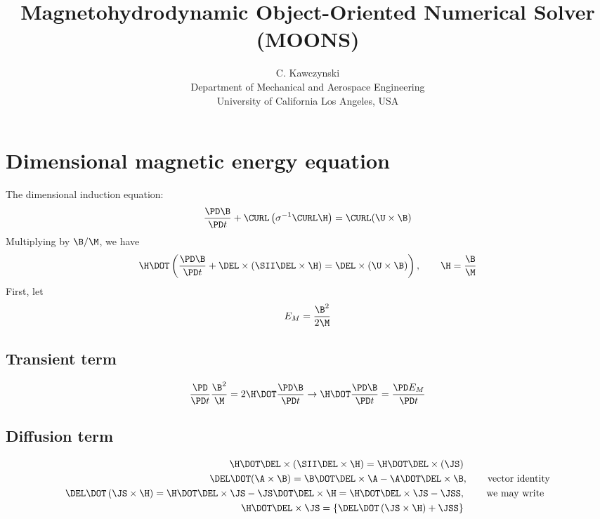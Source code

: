 \documentclass[11pt]{article}
\begin{document}
\doublespacing
\title{Magnetohydrodynamic Object-Oriented Numerical Solver (MOONS)}
\author{C. Kawczynski \\
Department of Mechanical and Aerospace Engineering \\
University of California Los Angeles, USA\\
}
\maketitle

\section{Dimensional magnetic energy equation}
The dimensional induction equation:
\begin{equation}
	\frac{\PD \B}{\PD t} + \CURL \left( \sigma^{-1}\CURL \H \right) 
	= \CURL (\U \times \B)
\end{equation}
Multiplying by $\B / \M$, we have
\begin{equation}
	\H \DOT
	\left(
	\frac{\PD \B}{\PD t} +
	\DEL \times (\SII \DEL \times \H) =
	\DEL \times (\U \times \B)
	\right), \qquad \H = \frac{\B}{\M}
\end{equation}
First, let
\begin{equation}
	E_M = \frac{\B^2}{2\M}
\end{equation}

\subsection{Transient term}
\begin{equation}
	\frac{\PD}{\PD t} \frac{\B^2}{\M} = 2 \H \DOT \frac{\PD \B}{\PD t} 
	\rightarrow
	\H \DOT \frac{\PD \B}{\PD t} =
	\frac{\PD E_M}{\PD t}
\end{equation}
\subsection{Diffusion term}
\begin{equation}\begin{aligned}
	\H \DOT \DEL \times \left( \SII \DEL \times \H \right) = \H \DOT \DEL \times \left( \JS \right) & \\
	\DEL \DOT (\A \times \B) = \B \DOT \DEL \times \A - \A \DOT \DEL \times \B &, \qquad \text{vector identity} \\
	\DEL \DOT \left(\JS \times \H \right) = 
	\H \DOT \DEL \times \JS - \JS \DOT \DEL \times \H = 
	\H \DOT \DEL \times \JS - \JSS, & \qquad \text{ we may write} \\
	\H \DOT \DEL \times \JS = 
	\left\{ \DEL \DOT \left(\JS \times \H \right) + \JSS \right\}
\end{aligned}\end{equation}
\end{document}

